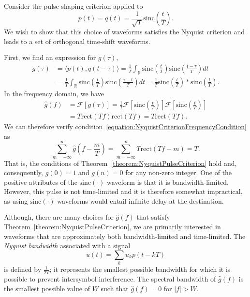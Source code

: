 \begin{example}
Consider the pulse-shaping criterion applied to
\begin{equation*}
p(t) = q(t) = \frac{1}{\sqrt{T}} \mathrm{sinc} \left( \frac{t}{T} \right) .
\end{equation*}
We wish to show that this choice of waveforms satisfies the Nyquist criterion and leads to a set of orthogonal time-shift waveforms.

First, we find an expression for $g(\tau)$,
\begin{equation*}
\begin{split}
g(\tau) &= \langle p(t), q(t-\tau) \rangle
= \frac{1}{T} \int_{\mathbb{R}} \mathrm{sinc} \left( \frac{t}{T} \right)
\mathrm{sinc} \left( \frac{t - \tau}{T} \right) dt \\
&= \frac{1}{T} \int_{\mathbb{R}} \mathrm{sinc} \left( \frac{t}{T} \right)
\mathrm{sinc} \left( \frac{\tau - t}{T} \right) dt
= \frac{1}{T} \mathrm{sinc} \left( \frac{t}{T} \right)
\ast \mathrm{sinc} \left( \frac{t}{T} \right) .
\end{split}
\end{equation*}
In the frequency domain, we have
\begin{equation*}
\begin{split}
\hat{g}(f) &= \mathcal{F} \left[ g(\tau) \right]
= \frac{1}{T} \mathcal{F} \left[ \mathrm{sinc} \left( \frac{t}{T} \right) \right]
\mathcal{F} \left[ \mathrm{sinc} \left( \frac{t}{T} \right) \right] \\
&= T \mathrm{rect} (T f) \mathrm{rect} (T f)
= T \mathrm{rect} (T f) .
\end{split}
\end{equation*}
We can therefore verify condition~\eqref{equation:NyquistCriterionFrequencyCondition} as
\begin{equation*}
\sum_{m = -\infty}^{\infty}
\hat{g} \left( f - \frac{m}{T} \right)
= \sum_{m = - \infty}^{\infty} T \mathrm{rect} (Tf - m)
= T .
\end{equation*}
That is, the conditions of Theorem~\ref{theorem:NyquistPulseCriterion} hold and, consequently, $g(0) = 1$ and $g(n) = 0$ for any non-zero integer.
One of the positive attributes of the $\mathrm{sinc} (\cdot)$ waveform is that it is bandwidth-limited.
However, this pulse is not time-limited and it is therefore somewhat impractical, as using $\mathrm{sinc} (\cdot)$ waveforms would entail infinite delay at the destination.
\end{example}

Although, there are many choices for $\hat{g}(f)$ that satisfy Theorem~\ref{theorem:NyquistPulseCriterion}, we are primarily interested in waveforms that are approximately both bandwidth-limited and time-limited.
The \emph{Nyquist bandwidth} associated with a signal
\begin{equation*}
u(t) = \sum_k u_k p(t -kT)
\end{equation*}
is defined by $\frac{1}{2T}$; it represents the smallest possible bandwidth for which it is possible to prevent intersymbol interference.
The spectral bandwidth of $\hat{g}(f)$ is the smallest possible value of $W$ such that $\hat{g}(f) = 0$ for $|f| > W$.

